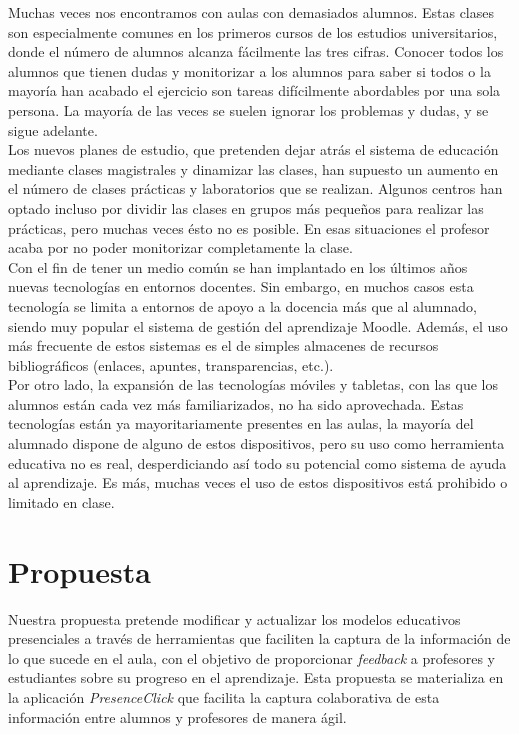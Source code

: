 Muchas veces nos encontramos con aulas con demasiados alumnos. Estas clases son especialmente comunes en los primeros cursos de los estudios universitarios, donde el número de alumnos alcanza fácilmente las tres cifras. Conocer todos los alumnos que tienen dudas y monitorizar a los alumnos para saber si todos o la mayoría han acabado el ejercicio son tareas difícilmente abordables por una sola persona. La mayoría de las veces se suelen ignorar los problemas y dudas, y se sigue adelante.\\

Los nuevos planes de estudio, que pretenden dejar atrás el sistema de educación mediante clases magistrales y dinamizar las clases, han supuesto un aumento en el número de clases prácticas y laboratorios que se realizan. Algunos centros han optado incluso por dividir las clases en grupos más pequeños para realizar las prácticas, pero muchas veces ésto no es posible. En esas situaciones el profesor acaba por no poder monitorizar completamente la clase.\\

Con el fin de tener un medio común se han implantado en los últimos años nuevas tecnologías en entornos docentes. Sin embargo, en muchos casos esta tecnología se limita a entornos de apoyo a la docencia más que al alumnado, siendo muy popular el sistema de gestión del aprendizaje Moodle. Además, el uso más frecuente de estos sistemas es el de simples almacenes de recursos bibliográficos (enlaces, apuntes, transparencias, etc.).\\

Por otro lado, la expansión de las tecnologías móviles y tabletas, con las que los alumnos están cada vez más familiarizados, no ha sido aprovechada. Estas tecnologías están ya mayoritariamente presentes en las aulas, la mayoría del alumnado dispone de alguno de estos dispositivos, pero su uso como herramienta educativa no es real, desperdiciando así todo su potencial como sistema de ayuda al aprendizaje. Es más, muchas veces el uso de estos dispositivos está prohibido o limitado en clase.\\

\section{Propuesta}

Nuestra propuesta pretende modificar y actualizar los modelos educativos presenciales a través de herramientas que faciliten la captura de la información de lo que sucede en el aula, con el objetivo de proporcionar \textit{feedback} a profesores y estudiantes sobre su progreso en el aprendizaje. Esta propuesta se materializa en la aplicación \textit{PresenceClick} que facilita la captura colaborativa de esta información entre alumnos y profesores de manera ágil.\\

